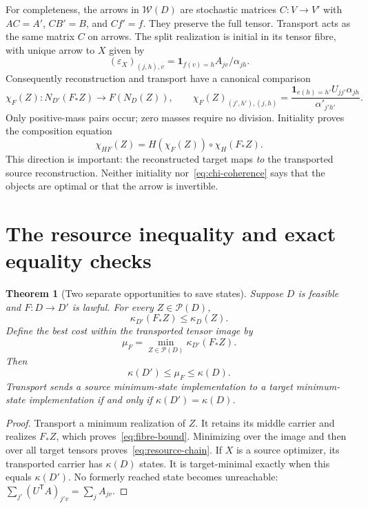 \documentclass[11pt]{article}
\newcommand{\Pcal}{\mathcal P}
\newcommand{\Wcal}{\mathcal W}
\newtheorem{theorem}{Theorem}[section]
\theoremstyle{remark}
\begin{document}
For completeness, the arrows in $\Wcal(D)$ are stochastic matrices $C:V\to V'$ with $AC=A'$, $CB'=B$, and $Cf'=f$. They preserve the full tensor. Transport acts as the same matrix $C$ on arrows. The split realization is initial in its tensor fibre, with unique arrow to $X$ given by
\[
 (\varepsilon_X)_{(j,h),v}
 =\mathbf1_{f(v)=h}A_{jv}/\alpha_{jh}.
\]
Consequently reconstruction and transport have a canonical comparison
\begin{equation}\label{eq:posterior}
 \chi_F(Z):N_{D'}(F_*Z)\longrightarrow F(N_D(Z)),\qquad
 \chi_F(Z)_{(j',h'),(j,h)}
 =\frac{\mathbf1_{e(h)=h'}U_{jj'}\alpha_{jh}}{\alpha'_{j'h'}}.
\end{equation}
Only positive-mass pairs occur; zero masses require no division. Initiality proves the composition equation
\begin{equation}\label{eq:chi-coherence}
 \chi_{HF}(Z)=H(\chi_F(Z))\circ\chi_H(F_*Z).
\end{equation}
This direction is important: the reconstructed target maps \emph{to} the transported source reconstruction. Neither initiality nor~\eqref{eq:chi-coherence} says that the objects are optimal or that the arrow is invertible.

\section{The resource inequality and exact equality checks}\label{sec:resources}
\begin{theorem}[Two separate opportunities to save states]\label{thm:resource-chain}
Suppose $D$ is feasible and $F:D\to D'$ is lawful. For every $Z\in\Pcal(D)$,
\begin{equation}\label{eq:fibre-bound}
 \kappa_{D'}(F_*Z)\le\kappa_D(Z).
\end{equation}
Define the best cost within the transported tensor image by
\[
 \mu_F=\min_{Z\in\Pcal(D)}\kappa_{D'}(F_*Z).
\]
Then
\begin{equation}\label{eq:resource-chain}
 \kappa(D')\le\mu_F\le\kappa(D).
\end{equation}
Transport sends a source minimum-state implementation to a target minimum-state implementation if and only if $\kappa(D')=\kappa(D)$.
\end{theorem}
\begin{proof}
Transport a minimum realization of $Z$. It retains its middle carrier and realizes $F_*Z$, which proves~\eqref{eq:fibre-bound}. Minimizing over the image and then over all target tensors proves~\eqref{eq:resource-chain}. If $X$ is a source optimizer, its transported carrier has $\kappa(D)$ states. It is target-minimal exactly when this equals $\kappa(D')$. No formerly reached state becomes unreachable: $\sum_{j'}(U^{\mathsf T}A)_{j'v}=\sum_jA_{jv}$.
\end{proof}
\end{document}
